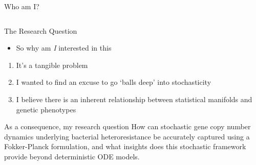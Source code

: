 \documentclass[aspectratio=169,  notheorems, sOuRcEs]{RUCPresentation}
\begin{document}
\begin{frame}{Who am I?}
\begin{columns}[T]
    \end{columns}

\end{frame}

\begin{frame}{The Research Question}

    \begin{itemize}
        \item So why am \emph{I} interested in this
    \end{itemize}
    \pause
    \begin{enumerate}[<+->]
        \item It's a tangible problem
        \item I wanted to find an excuse to go `balls deep' into stochasticity
        \item I believe there is an inherent relationship between
            statistical manifolds and genetic phenotypes
    \end{enumerate}

    \pause
    \begin{block}{As a consequence, my research question}
        How can stochastic gene copy number dynamics underlying bacterial
        heteroresistance be accurately captured using a Fokker-Planck formulation,
        and what insights does this stochastic framework provide beyond deterministic ODE models.
    \end{block}

\end{frame}

\end{document}
